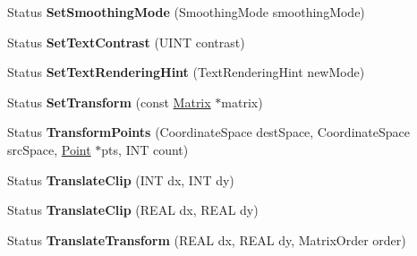 \begin{DoxyCompactItemize}
\item 
\mbox{\label{class_graphics_a63d14424775851ec8c46c4ae6d928e4d}} 
Status {\bfseries Set\+Smoothing\+Mode} (Smoothing\+Mode smoothing\+Mode)
\item 
\mbox{\label{class_graphics_a5b08a4b810866b9a83125eea7aece5f6}} 
Status {\bfseries Set\+Text\+Contrast} (U\+I\+NT contrast)
\item 
\mbox{\label{class_graphics_a5422743ab848451121c575df949cb20f}} 
Status {\bfseries Set\+Text\+Rendering\+Hint} (Text\+Rendering\+Hint new\+Mode)
\item 
\mbox{\label{class_graphics_aa215e8fa9533dcc6670f093f59ca1544}} 
Status {\bfseries Set\+Transform} (const \hyperlink{class_matrix}{Matrix} $\ast$matrix)
\item 
\mbox{\label{class_graphics_a12bcf820dc1c8b396eb8e51fd364d369}} 
Status {\bfseries Transform\+Points} (Coordinate\+Space dest\+Space, Coordinate\+Space src\+Space, \hyperlink{struct_point}{Point} $\ast$pts, I\+NT count)
\item 
\mbox{\label{class_graphics_abf00fa6520a8328f2170563ef4fc2bab}} 
Status {\bfseries Translate\+Clip} (I\+NT dx, I\+NT dy)
\item 
\mbox{\label{class_graphics_a9f835ed3003a8fabe168ef867ba33c88}} 
Status {\bfseries Translate\+Clip} (R\+E\+AL dx, R\+E\+AL dy)
\item 
\mbox{\label{class_graphics_aa8000f1eb7126ac559a957daaeef2cd3}} 
Status {\bfseries Translate\+Transform} (R\+E\+AL dx, R\+E\+AL dy, Matrix\+Order order)
\end{DoxyCompactItemize}
